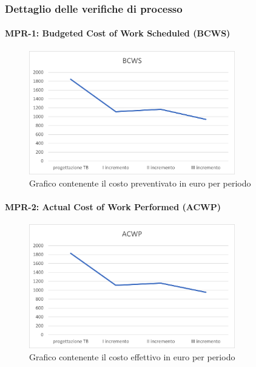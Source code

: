 \subsubsection{Dettaglio delle verifiche di processo}

\paragraph{MPR-1: Budgeted Cost of Work Scheduled (BCWS)}\label{_BCWS}
\begin{figure}[!htb]
    \centering
    \includegraphics[width=0.8\textwidth]{res/images/metriche_costi/BCWS.png}
    \caption{Grafico contenente il costo preventivato in euro per periodo}
\end{figure}

\paragraph{MPR-2: Actual Cost of Work Performed (ACWP)}\label{_ACWP}
\begin{figure}[!htb]
    \centering
    \includegraphics[width=0.8\textwidth]{res/images/metriche_costi/ACWP.png}
    \caption{Grafico contenente il costo effettivo in euro per periodo}
\end{figure}
\newpage

